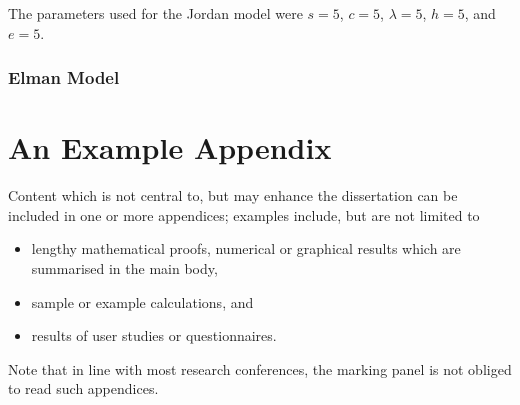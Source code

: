 \documentclass[ author={Stephen Livermore-Tozer},
				supervisor={Dr. Peter Flach},
				degree={MEng},
				title={Algorithmic Co-composition Using Machine Learning},
				subtitle={},
				type={research},
				year={2016} ]{dissertation}
\begin{document}
	The parameters used for the Jordan model were $s = 5$, $c = 5$, $\lambda = 5$, $h = 5$, and $e = 5$. 
	
	
	
	\subsection{Elman Model}
	


	\backmatter
	
	
	
	\appendix
	
	\chapter{An Example Appendix}
	\label{appx:example}
	
	Content which is not central to, but may enhance the dissertation can be 
	included in one or more appendices; examples include, but are not limited
	to
	
	\begin{itemize}
		\item lengthy mathematical proofs, numerical or graphical results which 
		are summarised in the main body,
		\item sample or example calculations, 
		and
		\item results of user studies or questionnaires.
	\end{itemize}
	
	\noindent
	Note that in line with most research conferences, the marking panel is not
	obliged to read such appendices.
	
	
\end{document}
